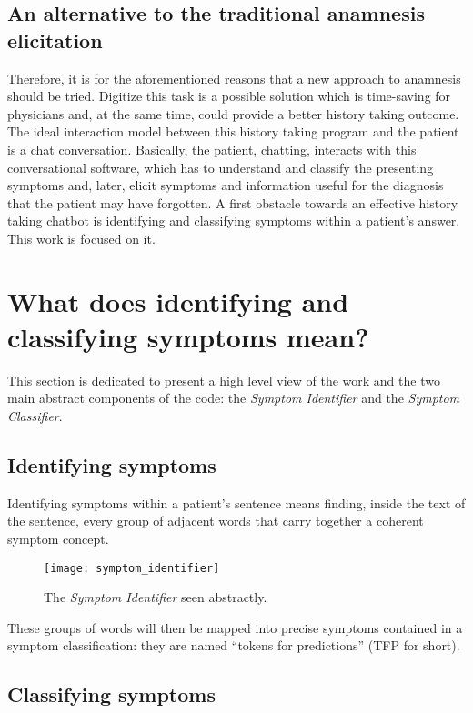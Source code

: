 \subsection{An alternative to the traditional anamnesis elicitation}

Therefore, it is for the aforementioned reasons that a new approach to anamnesis should be tried. Digitize this task is a possible solution which is time-saving for physicians and, at the same time, could provide a better history taking outcome. The ideal interaction model between this history taking program and the patient is a chat conversation. Basically, the patient, chatting, interacts with this conversational software, which has to understand and classify the presenting symptoms and, later, elicit symptoms and information useful for the diagnosis that the patient may have forgotten. A first obstacle towards an effective history taking chatbot is identifying and classifying symptoms within a patient’s answer. This work is focused on it.

\section{What does identifying and classifying symptoms mean?}

This section is dedicated to present a high level view of the work and the two main abstract components of the code: the \textit{Symptom Identifier} and the \textit{Symptom Classifier}. 

\label{sec:identifying_classifying}
\subsection{Identifying symptoms}

Identifying symptoms within a patient's sentence means finding, inside the text of the sentence, every group of adjacent words that carry together a coherent symptom concept.

\begin{figure}[h]
\centering
\texttt{[image: symptom\_identifier]}
\caption{The \textit{Symptom Identifier} seen abstractly.}
\medskip
\end{figure}
\newpage
These groups of words will then be mapped into precise symptoms contained in a symptom classification: they are named “tokens for predictions” (TFP for short).

\subsection{Classifying symptoms}
\label{sec:cla_symp}

